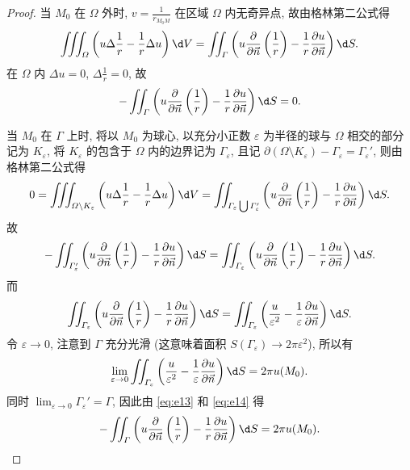 \begin{proof}
  当 $M_0$ 在 $\varOmega$ 外时, $v=\frac{1}{r_{M_0M}}$ 在区域 $\varOmega$ 内无奇异点, 故由格林第二公式得
  \[\iiint_{\varOmega} \left(u\Delta\frac{1}{r}-\frac{1}{r}\Delta u\right)\d V
    = \iint_{\varGamma}\left(u\frac{\partial}{\partial\vec{n}}\left(\frac{1}{r}\right)
      - \frac{1}{r}\frac{\partial u}{\partial\vec{n}}\right) \d S.\]
  在 $\varOmega$ 内 $\Delta u=0$, $\Delta\frac{1}{r}=0$, 故
  \[-\iint_{\varGamma}\left(u\frac{\partial}{\partial\vec{n}}\left(\frac{1}{r}\right)
    - \frac{1}{r}\frac{\partial u}{\partial\vec{n}}\right)\d S = 0.\]

  当 $M_0$ 在 $\varGamma$ 上时, 将以 $M_0$ 为球心, 
  以充分小正数 $\varepsilon$ 为半径的球与 $\varOmega$ 相交的部分记为 $K_{\varepsilon}$,
  将 $K_{\varepsilon}$ 的包含于 $\varOmega$ 内的边界记为 $\varGamma_{\varepsilon}$,
  且记 $\partial(\varOmega\setminus K_{\varepsilon})-\varGamma_{\varepsilon}=\varGamma_{\varepsilon}'$,
  则由格林第二公式得
  \[0 = \iiint_{\varOmega\backslash K_{\varepsilon}}
    \left(u\Delta\frac{1}{r} - \frac{1}{r}\Delta u\right)\d V
    = \iint_{\varGamma_{\varepsilon}\bigcup\varGamma_{\varepsilon}'} \left(u\frac{\partial}{\partial\vec{n}}
      \left(\frac{1}{r}\right)-\frac{1}{r}\frac{\partial u}{\partial\vec{n}}\right) \d S.\]
  故
  \begin{equation}\label{eq:e13}
    -\iint_{\varGamma_{\varepsilon}'} \left(u\frac{\partial}{\partial\vec{n}}\left(\frac{1}{r}\right)
    -\frac{1}{r}\frac{\partial u}{\partial\vec{n}}\right) \d S
    = \iint_{\varGamma_{\varepsilon}}\left(u\frac{\partial}{\partial\vec{n}}
      \left(\frac{1}{r}\right) - \frac{1}{r}\frac{\partial u}{\partial\vec{n}}\right)\d S.
  \end{equation}
  而
  \[\iint_{\varGamma_{\varepsilon}} \left(u\frac{\partial}{\partial\vec{n}}\left(\frac{1}{r}\right)
    -\frac{1}{r}\frac{\partial u}{\partial\vec{n}}\right) \d S
    = \iint_{\varGamma_{\varepsilon}}\left(\frac{u}{\varepsilon^2}
      - \frac{1}{\varepsilon}\frac{\partial u}{\partial\vec{n}}\right) \d S.\]
  令 $\varepsilon\to 0$, 注意到 $\varGamma$ 充分光滑
  (这意味着面积 $S(\varGamma_{\varepsilon})\to 2\pi\varepsilon^2$), 所以有
  \begin{equation}\label{eq:e14}
    \lim_{\varepsilon\to 0} \iint_{\varGamma_{\varepsilon}}
    \left(\frac{u}{\varepsilon^2}-\frac{1}{\varepsilon}\frac{\partial u}{\partial\vec{n}}\right)\d S
    = 2\pi u(M_0).
  \end{equation}
  同时 $\lim_{\varepsilon\to0}\varGamma_{\varepsilon}'=\varGamma$,
  因此由 \eqref{eq:e13} 和 \eqref{eq:e14} 得
  \[-\iint_{\varGamma} \left(u\frac{\partial}{\partial\vec{n}}\left(\frac{1}{r}\right)-\frac{1}{r}
    \frac{\partial u}{\partial\vec{n}}\right)\d S = 2\pi u(M_0). \qedhere\]
\end{proof}


